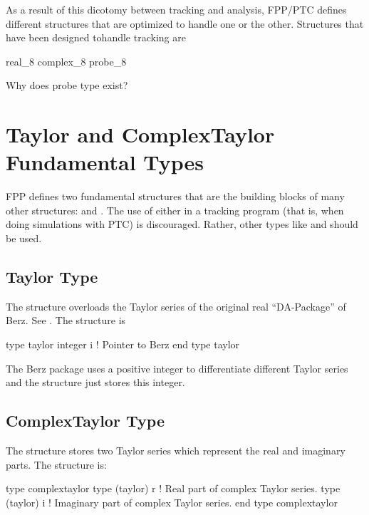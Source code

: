 \documentclass{hitec}     %
\newcommand{\Section}[1]{\section{#1}\vspace*{-1ex}}
\begin{document}
As a result of this dicotomy between tracking and analysis, FPP/PTC defines different structures that
are optimized to handle one or the other. Structures that have been designed tohandle tracking are
\begin{example}
  real_8
  complex_8
  probe_8
\end{example}

Why does probe type exist?

\Section{Taylor and ComplexTaylor Fundamental Types}
\label{s:fundamental}

FPP defines two fundamental structures that are the building blocks of many other structures:
 and . The  use of either in a tracking program (that is,
when doing simulations with PTC) is discouraged. Rather, other types like  and 
should be used.

\subsection{Taylor Type}
\label{s:taylor}

The  structure overloads the Taylor series of the original real ``DA-Package'' of
Berz. See . The structure is
\begin{code}
type taylor
   integer i    ! Pointer to Berz
end type taylor
\end{code}
The Berz package uses a positive integer to differentiate different Taylor series and the
 structure just stores this integer.

\subsection{ComplexTaylor Type}
\label{s:taylor}

The  structure stores two Taylor series which represent the real and imaginary parts.
The structure is:
\begin{code}
type complextaylor
   type (taylor) r     ! Real part of complex Taylor series.
   type (taylor) i     ! Imaginary part of complex Taylor series.
end type complextaylor
\end{code}
\end{document}
